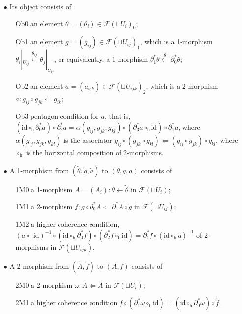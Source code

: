\documentclass[letterpaper,10pt, oneside]{article} %
\newcommand{\huaF}{\mathcal{F}}
\newcommand{\h}{\mathrm{h}}
\newcommand{\id}{\mathrm{id}}
\newcommand{\tg}{\widetilde{g}}
\newcommand{\tf}{\widetilde{f}}
\newcommand{\tA}{\widetilde{A}}
\newcommand{\ta}{\widetilde{a}}
\newcommand{\ttheta}{\widetilde{\theta}}
\begin{document}
\begin{itemize}
\item[$\bullet$]Its object consists of
\begin{enumerate}
\item[Ob0]   an element $\theta=(\theta_i)\in \huaF(\sqcup U_i)_0$;
\item[Ob1]   an element $g=(g_{ij}) \in \huaF(\sqcup U_{ij})_1$, which
  is a 1-morphism $
  \theta_i|_{U_{ij}} \xleftarrow{g_{ij}} \theta_j|_{U_{ij}}$, or
  equivalently, a 1-morphism $ \partial^*_1 \theta \xleftarrow{g} \partial_0^*\theta$;
\item[Ob2]  an element $a=(a_{ijk})\in \huaF(\sqcup U_{ijk} )_2$, which is a 2-morphism $a:
  g_{ij}\circ g_{jk} \Leftarrow g_{ik}$;
\item[Ob3] pentagon condition for $a$, that is, $ (\id\circ_\h \partial^*_0 a) \circ \partial_2^* a
 = \alpha(g_{ij}, g_{jk}, g_{kl}) \circ (\partial_3^* a
  \circ_\h \id) \circ \partial_1^* a$, where $\alpha(g_{ij}, g_{jk}, g_{kl})$ is the
  associator $g_{ij} \circ (g_{jk} \circ g_{kl}) \Leftarrow (g_{ij} \circ g_{jk} ) \circ g_{kl}
  $, where $\circ_\h$ is the
  horizontal composition of 2-morphisms.
\end{enumerate}
\item[$\bullet$] A 1-morphism from $(\ttheta, \tg, \ta)$ to $(\theta, g, a)$ consists of
\begin{enumerate}
\item[1M0] a 1-morphism $A=(A_i): \theta \leftarrow \ttheta$ in $\huaF(\sqcup U_i)$;
\item[1M1] a 2-morphism $f:    g
  \circ \partial^*_0 A \Leftarrow  \partial_1^* A \circ \tg $ in $\huaF(\sqcup U_{ij})$;
\item[1M2] a higher coherence condition, $(a\circ_\h \id)^{-1} \circ
 (\id \circ_\h \partial_0^* f) \circ   (\partial^*_2 f \circ_\h \id )
  = \partial_1^* f \circ (  \id \circ_\h \ta)^{-1} $ of 2-morphisms in
  $\huaF(\sqcup U_{ijk})$.
\end{enumerate}
\item[$\bullet$] A 2-morphism from $(\tA, \tf)$ to $(A, f)$ consists of
\begin{enumerate}
\item[2M0]  a 2-morphism $\omega: A \Leftarrow \tA$ in
  $\huaF(\sqcup U_i)$;
\item[2M1] a higher coherence condition $ f \circ   (\partial_1^* \omega \circ_\h \id)=
  (\id
  \circ_\h \partial_0^* \omega)  \circ \tf $.
\end{enumerate}
\end{itemize}
\end{document}
